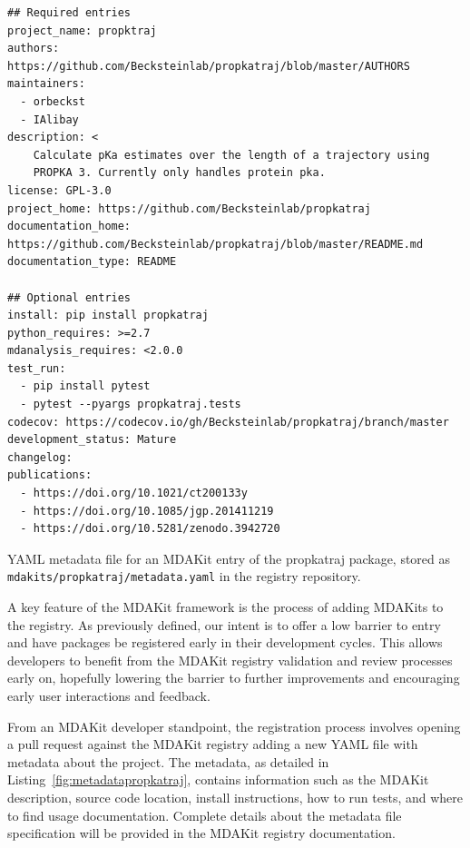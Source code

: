 \documentclass[9pt,whitepaper]{livecoms}
\begin{document}
\begin{listing*}[bht!]
    \centering
    \begin{verbatim}
## Required entries
project_name: propktraj
authors: https://github.com/Becksteinlab/propkatraj/blob/master/AUTHORS
maintainers:
  - orbeckst
  - IAlibay
description: <
    Calculate pKa estimates over the length of a trajectory using
    PROPKA 3. Currently only handles protein pka.
license: GPL-3.0
project_home: https://github.com/Becksteinlab/propkatraj
documentation_home: https://github.com/Becksteinlab/propkatraj/blob/master/README.md
documentation_type: README

## Optional entries
install: pip install propkatraj
python_requires: >=2.7
mdanalysis_requires: <2.0.0
test_run: 
  - pip install pytest
  - pytest --pyargs propkatraj.tests
codecov: https://codecov.io/gh/Becksteinlab/propkatraj/branch/master
development_status: Mature
changelog: 
publications:
  - https://doi.org/10.1021/ct200133y
  - https://doi.org/10.1085/jgp.201411219
  - https://doi.org/10.5281/zenodo.3942720
    \end{verbatim}
    \caption{YAML metadata file for an MDAKit entry of the propkatraj package, stored as \texttt{mdakits/propkatraj/metadata.yaml} in the registry repository.}
    \label{fig:metadatapropkatraj}
\end{listing*}

A key feature of the MDAKit framework is the process of adding MDAKits to the registry. As previously defined, our intent is to offer a low barrier to entry and have packages be registered early in their development cycles. This allows developers to benefit from the MDAKit registry validation and review processes early on, hopefully lowering the barrier to further improvements and encouraging early user interactions and feedback.
 
From an MDAKit developer standpoint, the registration process involves opening a pull request against the MDAKit registry adding a new YAML file with metadata about the project. The metadata, as detailed in Listing~\ref{fig:metadatapropkatraj}, contains information such as the MDAKit description, source code location, install instructions, how to run tests, and where to find usage documentation. Complete details about the metadata file specification will be provided in the MDAKit registry documentation.
\end{document}
